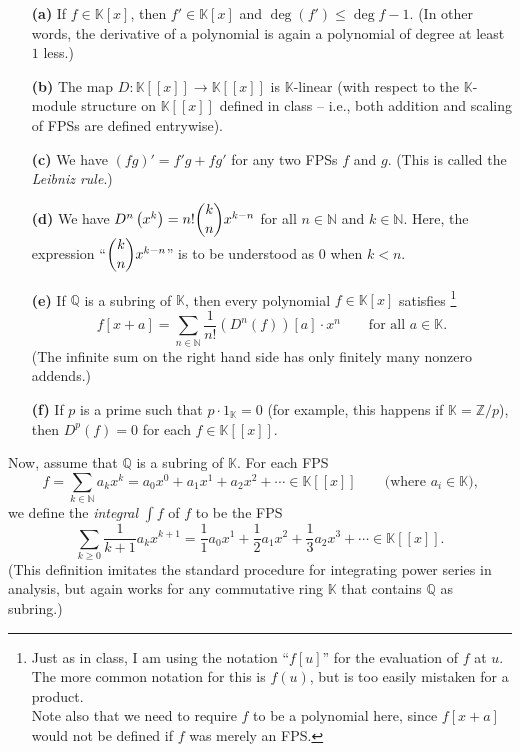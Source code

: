 \documentclass[paper=a4, fontsize=12pt]{scrartcl} %
\newcommand{\QQ}{\mathbb{Q}} %
\newcommand{\NN}{\mathbb{N}} %
\newcommand{\KK}{\mathbb{K}} %
\newcommand{\ZZ}{\mathbb{Z}} %
\newcommand{\tup}[1]{\left( #1 \right)}
\newcommand{\ive}[1]{\left[ #1 \right]}
\newcommand{\ivee}[1]{\left[ \left[ #1 \right] \right]}
\let\sumnonlimits\sum
\renewcommand{\sum}{\sumnonlimits\limits}
\theoremstyle{plainsl}
\theoremstyle{definition}
\theoremstyle{remark}
\begin{document}
\begin{enumerate}

\item[\textbf{(a)}]
If $f \in \KK\ive{x}$, then $f' \in \KK\ive{x}$ and
$\deg \tup{f'} \leq \deg f - 1$.
(In other words, the derivative of a polynomial is again
a polynomial of degree at least $1$ less.)

\item[\textbf{(b)}]
The map $D : \KK\ivee{x} \to \KK\ivee{x}$ is $\KK$-linear
(with respect to the $\KK$-module structure on $\KK\ivee{x}$
defined in class -- i.e., both addition and scaling of FPSs
are defined entrywise).

\item[\textbf{(c)}]
We have $\tup{fg}' = f' g + f g'$ for any two FPSs
$f$ and $g$.
(This is called the \textit{Leibniz rule}.)

\item[\textbf{(d)}]
We have $D^n \tup{x^k} = n! \dbinom{k}{n} x^{k-n}$
for all $n \in \NN$ and $k \in \NN$.
Here, the expression ``$\dbinom{k}{n} x^{k-n}$'' is
to be understood as $0$ when $k < n$.

\item[\textbf{(e)}]
If $\QQ$ is a subring of $\KK$, then
every polynomial $f \in \KK\ive{x}$ satisfies%
\footnote{Just as in class, I am using the notation
``$f \ive{u}$'' for the evaluation of $f$ at $u$.
The more common notation for this is $f \tup{u}$,
but is too easily mistaken for a product. \\
Note also that we need to require $f$ to be a
polynomial here, since $f \ive{x+a}$ would not
be defined if $f$ was merely an FPS.}
\[
f \ive{x+a} = \sum_{n \in \NN} \dfrac{1}{n!} \tup{D^n \tup{f}} \ive{a} \cdot x^n
\qquad \text{for all $a \in \KK$} .
\]
(The infinite sum on the right hand side has only
finitely many nonzero addends.)

\item[\textbf{(f)}]
If $p$ is a prime such that $p \cdot 1_\KK = 0$
(for example, this happens if $\KK = \ZZ / p$),
then $D^p \tup{f} = 0$ for each $f \in \KK\ivee{x}$.

\end{enumerate}

Now, assume that $\QQ$ is a subring of $\KK$.
For each FPS
\[
f = \sum_{k \in \NN} a_k x^k = a_0 x^0 + a_1 x^1 + a_2 x^2 + \cdots \in \KK\ivee{x}
\qquad
\text{(where $a_i \in \KK$),}
\]
we define the \textit{integral} $\int f$ of $f$ to be the FPS
\[
\sum_{k \geq 0} \dfrac{1}{k+1} a_k x^{k+1}
= \dfrac{1}{1} a_0 x^1 + \dfrac{1}{2} a_1 x^2 + \dfrac{1}{3} a_2 x^3 + \cdots \in \KK\ivee{x} .
\]
(This definition imitates the standard procedure for integrating
power series in analysis, but again works for any commutative
ring $\KK$ that contains $\QQ$ as subring.)
\end{document}
